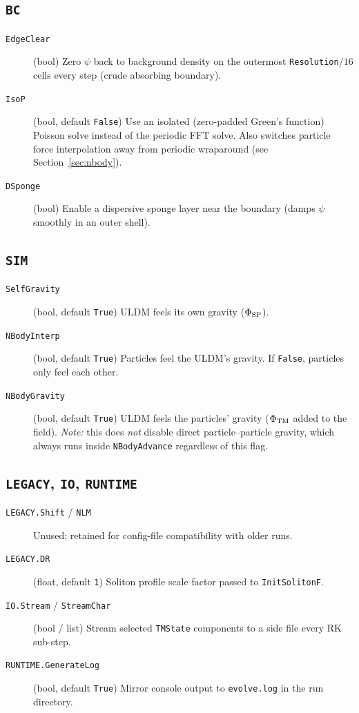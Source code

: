 \documentclass[11pt]{article}
\newcommand{\code}[1]{\texttt{#1}}
\newcommand{\field}[1]{\texttt{#1}}
\begin{document}
\subsection{\field{BC}}
\begin{description}
  \item[\field{EdgeClear}] (bool) Zero $\psi$ back to background density on
    the outermost \code{Resolution}$/16$ cells every step (crude absorbing
    boundary).
  \item[\field{IsoP}] (bool, default \code{False}) Use an isolated (zero-padded
    Green's function) Poisson solve instead of the periodic FFT solve. Also
    switches particle force interpolation away from periodic wraparound (see
    Section~\ref{sec:nbody}).
  \item[\field{DSponge}] (bool) Enable a dispersive sponge layer near the
    boundary (damps $\psi$ smoothly in an outer shell).
\end{description}

\subsection{\field{SIM}}
\begin{description}
  \item[\field{SelfGravity}] (bool, default \code{True}) ULDM feels its own
    gravity ($\Phi_{\rm SP}$).
  \item[\field{NBodyInterp}] (bool, default \code{True}) Particles feel the
    ULDM's gravity. If \code{False}, particles only feel each other.
  \item[\field{NBodyGravity}] (bool, default \code{True}) ULDM feels the
    particles' gravity ($\Phi_{\rm TM}$ added to the field). \emph{Note:} this
    does \emph{not} disable direct particle--particle gravity, which always
    runs inside \code{NBodyAdvance} regardless of this flag.
\end{description}

\subsection{\field{LEGACY}, \field{IO}, \field{RUNTIME}}
\begin{description}
  \item[\field{LEGACY.Shift} / \field{NLM}] Unused; retained for config-file
    compatibility with older runs.
  \item[\field{LEGACY.DR}] (float, default \code{1}) Soliton profile scale
    factor passed to \code{InitSolitonF}.
  \item[\field{IO.Stream} / \field{StreamChar}] (bool / list) Stream selected
    \code{TMState} components to a side file every RK sub-step.
  \item[\field{RUNTIME.GenerateLog}] (bool, default \code{True}) Mirror console
    output to \code{evolve.log} in the run directory.
\end{description}
\end{document}
